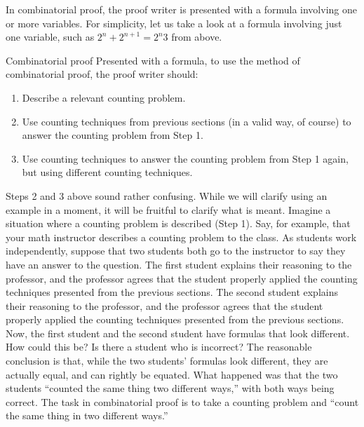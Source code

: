 \documentclass{book}
\theoremstyle{ekimcustom}
\begin{document}
In combinatorial proof, the proof writer is presented with a formula involving one or more variables. For simplicity, let us take a look at a formula involving just one variable, such as $2^n+2^{n+1} = 2^n 3$ from above.
\begin{bmethod}{Combinatorial proof}{}
Presented with a formula, to use the method of combinatorial proof, the proof writer should:
\begin{enumerate}
\item Describe a relevant counting problem.
\item Use counting techniques from previous sections (in a valid way, of course) to answer the counting problem from Step 1.
\item Use counting techniques to answer the counting problem from Step 1 again, but using different counting techniques.
\end{enumerate}
\end{bmethod}
Steps 2 and 3 above sound rather confusing. While we will clarify using an example in a moment, it will be fruitful to clarify what is meant. Imagine a situation where a counting problem is described (Step 1). Say, for example, that your math instructor describes a counting problem to the class. As students work independently, suppose that two students both go to the instructor to say they have an answer to the question. The first student explains their reasoning to the professor, and the professor agrees that the student properly applied the counting techniques presented from the previous sections. The second student explains their reasoning to the professor, and the professor agrees that the student properly applied the counting techniques presented from the previous sections. Now, the first student and the second student have formulas that look different. How could this be? Is there a student who is incorrect? The reasonable conclusion is that, while the two students' formulas look different, they are actually equal, and can rightly be equated. What happened was that the two students ``counted the same thing two different ways,'' with both ways being correct. The task in combinatorial proof is to take a counting problem and ``count the same thing in two different ways.''
\end{document}
